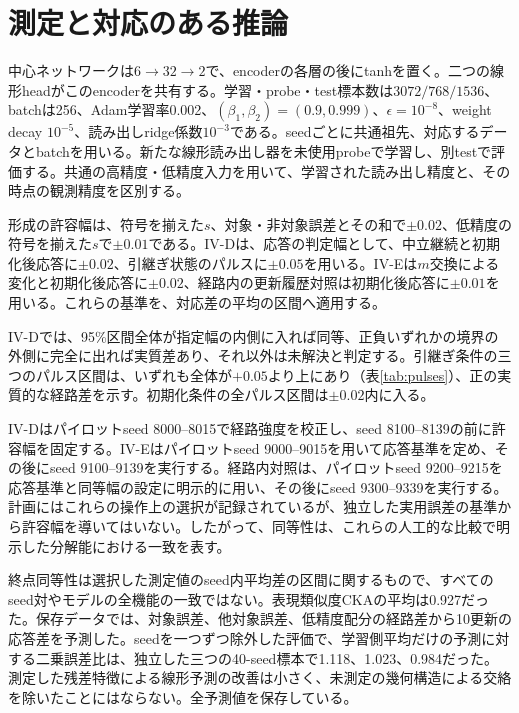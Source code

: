 \section{測定と対応のある推論}
\label{app:measurement}
中心ネットワークは$6\to32\to2$で、encoderの各層の後にtanhを置く。二つの線形headがこのencoderを共有する。学習・probe・test標本数は$3072/768/1536$、batchは256、Adam学習率0.002、$(\beta_1,\beta_2)=(0.9,0.999)$、$\epsilon=10^{-8}$、weight decay $10^{-5}$、読み出しridge係数$10^{-3}$である。seedごとに共通祖先、対応するデータとbatchを用いる。新たな線形読み出し器を未使用probeで学習し、別testで評価する。共通の高精度・低精度入力を用いて、学習された読み出し精度と、その時点の観測精度を区別する。

形成の許容幅は、符号を揃えた$s$、対象・非対象誤差とその和で$\pm0.02$、低精度の符号を揃えた$s$で$\pm0.01$である。IV-Dは、応答の判定幅として、中立継続と初期化後応答に$\pm0.02$、引継ぎ状態のパルスに$\pm0.05$を用いる。IV-Eは$m$交換による変化と初期化後応答に$\pm0.02$、経路内の更新履歴対照は初期化後応答に$\pm0.01$を用いる。これらの基準を、対応差の平均の区間へ適用する。

IV-Dでは、95\%区間全体が指定幅の内側に入れば同等、正負いずれかの境界の外側に完全に出れば実質差あり、それ以外は未解決と判定する。引継ぎ条件の三つのパルス区間は、いずれも全体が$+0.05$より上にあり（表\ref{tab:pulses}）、正の実質的な経路差を示す。初期化条件の全パルス区間は$\pm0.02$内に入る。

IV-Dはパイロットseed 8000--8015で経路強度を校正し、seed 8100--8139の前に許容幅を固定する。IV-Eはパイロットseed 9000--9015を用いて応答基準を定め、その後にseed 9100--9139を実行する。経路内対照は、パイロットseed 9200--9215を応答基準と同等幅の設定に明示的に用い、その後にseed 9300--9339を実行する。計画にはこれらの操作上の選択が記録されているが、独立した実用誤差の基準から許容幅を導いてはいない。したがって、同等性は、これらの人工的な比較で明示した分解能における一致を表す。

終点同等性は選択した測定値のseed内平均差の区間に関するもので、すべてのseed対やモデルの全機能の一致ではない。表現類似度CKAの平均は0.927だった。保存データでは、対象誤差、他対象誤差、低精度配分の経路差から10更新の応答差を予測した。seedを一つずつ除外した評価で、学習側平均だけの予測に対する二乗誤差比は、独立した三つの40-seed標本で1.118、1.023、0.984だった。測定した残差特徴による線形予測の改善は小さく、未測定の幾何構造による交絡を除いたことにはならない。全予測値を保存している。

